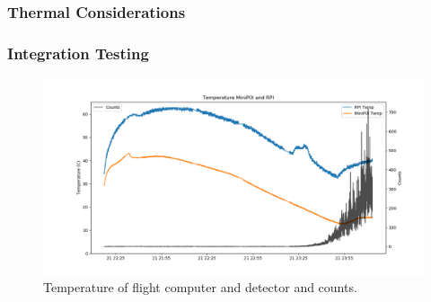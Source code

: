 \subsubsection{Thermal Considerations}
\subsubsection{Integration Testing}
\begin{figure}[h!]
	\begin{center}
	\includegraphics[width=\textwidth]{figures/tempsandcountsvtime.png}
	\caption{Temperature of flight computer and detector and counts.}
	\label{fig:integrationtemps}
	\end{center}
\end{figure}
